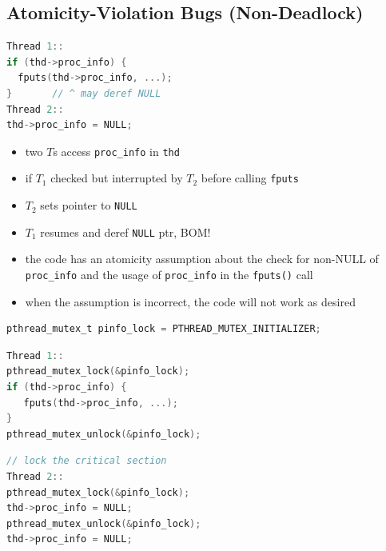 \documentclass[8pt,a4paper,landscape]{extarticle}
\begin{document}
\pagestyle{empty}

\begin{multicols*}{3}
% 
% 
% 
% 

% 
% 
% 
% 
% 
% 
% 
% 
% 
% 
% 
\section*{Atomicity-Violation Bugs (Non-Deadlock)}
\begin{minipage}{0.5\linewidth}
\begin{lstlisting}[language=c]
Thread 1::
if (thd->proc_info) {
  fputs(thd->proc_info, ...);
}       // ^ may deref NULL
Thread 2::
thd->proc_info = NULL;
\end{lstlisting}
\end{minipage}
\begin{minipage}{0.5\linewidth}
  \flushleft
  \begin{itemize}
  \item two $T$s access \texttt{proc\_info} in \texttt{thd}
  \item if $T_1$ checked but interrupted by $T_2$ before calling \texttt{fputs}
  \item $T_2$ sets pointer to \texttt{NULL}
  \item $T_1$ resumes and deref \texttt{NULL} ptr, BOM!
  \end{itemize}
\end{minipage}
\begin{itemize}
\item the code has an atomicity assumption about the check for non-NULL of \texttt{proc\_info} and the usage of \texttt{proc\_info} in the \texttt{fputs()} call
\item when the assumption is incorrect, the code will not work as desired
\end{itemize}
\begin{lstlisting}[language=c]
pthread_mutex_t pinfo_lock = PTHREAD_MUTEX_INITIALIZER;
\end{lstlisting}
\begin{minipage}{0.5\linewidth}
\begin{lstlisting}[language=c]
Thread 1::
pthread_mutex_lock(&pinfo_lock);
if (thd->proc_info) {
   fputs(thd->proc_info, ...);
}
pthread_mutex_unlock(&pinfo_lock);
\end{lstlisting}
\end{minipage}
\begin{minipage}{0.5\linewidth}
\begin{lstlisting}[language=c,xleftmargin=4pt]
// lock the critical section
Thread 2::
pthread_mutex_lock(&pinfo_lock);
thd->proc_info = NULL;
pthread_mutex_unlock(&pinfo_lock);
thd->proc_info = NULL;
\end{lstlisting}
\end{minipage}

\end{multicols*}
\end{document}
